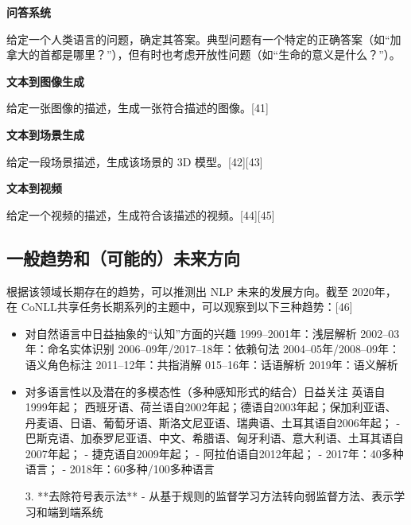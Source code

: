 \textbf{问答系统}  

给定一个人类语言的问题，确定其答案。典型问题有一个特定的正确答案（如“加拿大的首都是哪里？”），但有时也考虑开放性问题（如“生命的意义是什么？”）。

\textbf{文本到图像生成} 

给定一张图像的描述，生成一张符合描述的图像。[41]

\textbf{文本到场景生成}  

给定一段场景描述，生成该场景的 3D 模型。[42][43]

\textbf{文本到视频}  

给定一个视频的描述，生成符合该描述的视频。[44][45]
\subsection{一般趋势和（可能的）未来方向}
根据该领域长期存在的趋势，可以推测出 NLP 未来的发展方向。截至 2020年，在 CoNLL共享任务长期系列的主题中，可以观察到以下三种趋势：[46]
\begin{itemize}
\item 对自然语言中日益抽象的“认知”方面的兴趣 1999–2001年：浅层解析 2002–03年：命名实体识别 2006–09年/2017–18年：依赖句法 2004–05年/2008–09年：语义角色标注  2011–12年：共指消解 015–16年：话语解析 2019年：语义解析
\item 对多语言性以及潜在的多模态性（多种感知形式的结合）日益关注 英语自1999年起； 西班牙语、荷兰语自2002年起；德语自2003年起；保加利亚语、丹麦语、日语、葡萄牙语、斯洛文尼亚语、瑞典语、土耳其语自2006年起；  
   - 巴斯克语、加泰罗尼亚语、中文、希腊语、匈牙利语、意大利语、土耳其语自2007年起；  
   - 捷克语自2009年起；  
   - 阿拉伯语自2012年起；  
   - 2017年：40多种语言；  
   - 2018年：60多种/100多种语言

3. **去除符号表示法**  
   - 从基于规则的监督学习方法转向弱监督方法、表示学习和端到端系统
\end{itemize}